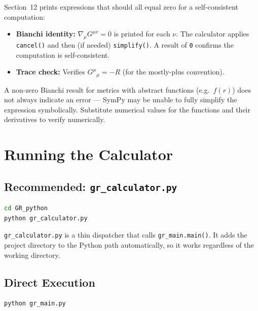 \documentclass[11pt,a4paper]{article}
\newcommand{\code}[1]{\texttt{\small#1}}
\begin{document}
Section~12 prints expressions that should all equal zero for a
self-consistent computation:

\begin{itemize}
  \item \textbf{Bianchi identity:} $\nabla_\mu G^{\mu\nu} = 0$ is printed
        for each $\nu$.  The calculator applies \code{cancel()} and then
        (if needed) \code{simplify()}.  A result of \code{0} confirms the
        computation is self-consistent.
  \item \textbf{Trace check:} Verifies $G^\mu{}_\mu = -R$ (for the mostly-plus
        convention).
\end{itemize}

\begin{notebox}
  A non-zero Bianchi result for metrics with abstract functions (e.g.\
  $f(r)$) does not always indicate an error — SymPy may be unable to fully
  simplify the expression symbolically.  Substitute numerical values for the
  functions and their derivatives to verify numerically.
\end{notebox}

\section{Running the Calculator}
\label{sec:running}

\subsection{Recommended: \code{gr\_calculator.py}}

\begin{lstlisting}[language=bash,numbers=none]
cd GR_python
python gr_calculator.py
\end{lstlisting}

\code{gr\_calculator.py} is a thin dispatcher that calls
\code{gr\_main.main()}.  It adds the project directory to the Python path
automatically, so it works regardless of the working directory.

\subsection{Direct Execution}

\begin{lstlisting}[language=bash,numbers=none]
python gr_main.py
\end{lstlisting}
\end{document}
